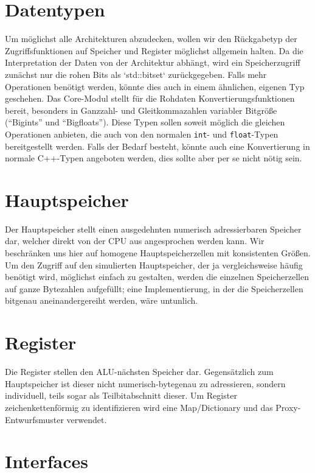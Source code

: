 \section{Datentypen}

Um möglichst alle Architekturen abzudecken, wollen wir den Rückgabetyp der Zugriffsfunktionen auf Speicher und Register möglichst allgemein halten. Da die Interpretation der Daten von der Architektur abhängt, wird ein Speicherzugriff zunächst nur die rohen Bits als `std::bitset` zurückgegeben. Falls mehr Operationen benötigt werden, könnte dies auch in einem ähnlichen, eigenen Typ geschehen. Das Core-Modul stellt für die Rohdaten Konvertierungsfunktionen bereit, besonders in Ganzzahl- und Gleitkommazahlen variabler Bitgrö{\ss}e (``Bigints'' und ``Bigfloats''). Diese Typen sollen soweit möglich die gleichen Operationen anbieten, die auch von den normalen \lstinline[style=C++]!int!- und \lstinline[style=C++]!float!-Typen bereitgestellt werden. Falls der Bedarf besteht, könnte auch eine Konvertierung in normale C++-Typen angeboten werden, dies sollte aber per se nicht nötig sein.


\section{Hauptspeicher}
Der Hauptspeicher stellt einen ausgedehnten numerisch adressierbaren Speicher dar, welcher direkt von der CPU aus angesprochen werden kann. Wir beschränken uns hier auf homogene Hauptspeicherzellen mit konsistenten Grö{\ss}en. Um den Zugriff auf den simulierten Hauptspeicher, der ja vergleichsweise häufig benötigt wird, möglichst einfach zu gestalten, werden die einzelnen Speicherzellen auf ganze Bytezahlen aufgefüllt; eine Implementierung, in der die Speicherzellen bitgenau aneinandergereiht werden, wäre untunlich.

\section{Register}
Die Register stellen den ALU-nächsten Speicher dar. Gegensätzlich zum Hauptspeicher ist dieser nicht numerisch-bytegenau zu adressieren, sondern individuell, teils sogar als Teilbitabschnitt dieser.  Um Register zeichenkettenförmig zu identifizieren wird eine Map/Dictionary und das Proxy-Entwurfsmuster verwendet.

\section{Interfaces}

